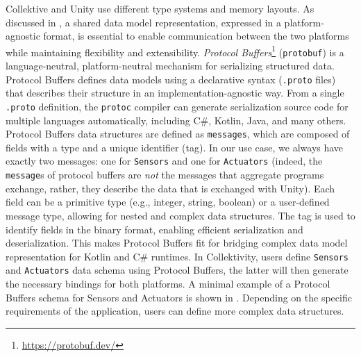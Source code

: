 \documentclass[runningheads]{llncs}
\newenvironment{inlinelist}{\begin{enumerate*}[label=\emph{(\roman*)}]}{\end{enumerate*}}
\begin{document}
Collektive and Unity use different type systems and memory layouts.
%
As discussed in ,
a shared data model representation,
expressed in a platform-agnostic format, 
is essential to enable communication between the two platforms while maintaining flexibility and extensibility.
%
%
%
%
\emph{Protocol Buffers}\footnote{\url{https://protobuf.dev/}} (\texttt{protobuf}) is a language-neutral,
platform-neutral mechanism for serializing structured data.
%
Protocol Buffers defines data models using a declarative syntax (\texttt{.proto} files)
that describes their structure in an implementation-agnostic way.
%
From a single \texttt{.proto} definition,
the \texttt{protoc} compiler can generate serialization source code for multiple languages automatically,
including C\#, Kotlin, Java, and many others.
%
Protocol Buffers data structures are defined as \texttt{messages},
which are composed of fields with a type and a unique identifier (tag).
%
In our use case,
we always have exactly two messages: one for \texttt{Sensors} and one for \texttt{Actuators}
(indeed, the \texttt{message}s of protocol buffers are \emph{not} the messages that aggregate programs exchange,
rather, they describe the data that is exchanged with Unity).
%
Each field can be a primitive type (e.g., integer, string, boolean)
or a user-defined message type,
allowing for nested and complex data structures.
%
The tag is used to identify fields in the binary format, 
enabling efficient serialization and deserialization.
%
This makes Protocol Buffers fit for bridging complex data model representation for Kotlin and C\# runtimes.
%
In Collektivity, 
users define \texttt{Sensors} and \texttt{Actuators} data schema using Protocol Buffers,
the latter will then generate the necessary bindings for both platforms.
%
A minimal example of a Protocol Buffers schema for Sensors and Actuators is shown in .
%
Depending on the specific requirements of the application,
users can define more complex data structures.
\end{document}

